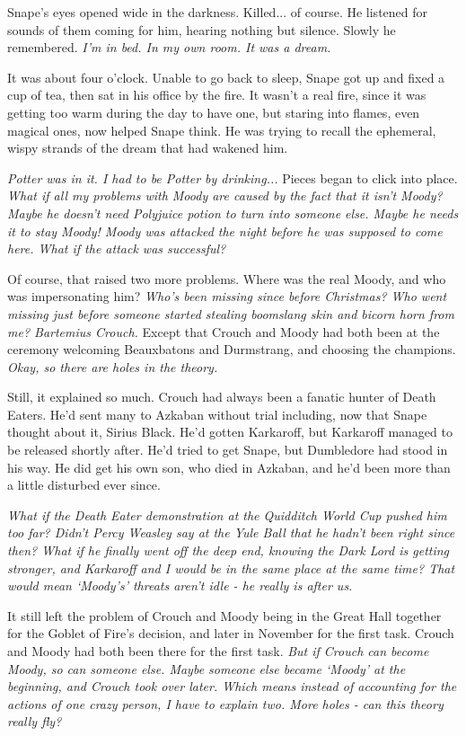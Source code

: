 \sbreak

Snape's eyes opened wide in the darkness. Killed... of course. He listened for sounds of them coming for him, hearing nothing but silence. Slowly he remembered. \emph{I'm in bed. In my own room. It was a dream.}

It was about four o'clock. Unable to go back to sleep, Snape got up and fixed a cup of tea, then sat in his office by the fire. It wasn't a real fire, since it was getting too warm during the day to have one, but staring into flames, even magical ones, now helped Snape think. He was trying to recall the ephemeral, wispy strands of the dream that had wakened him.

\emph{Potter was in it. I had to be Potter by drinking...} Pieces began to click into place. \emph{What if all my problems with Moody are caused by the fact that it isn't Moody? Maybe he doesn't need Polyjuice potion to turn into someone else. Maybe he needs it to stay Moody! Moody was attacked the night before he was supposed to come here. What if the attack was successful?}

Of course, that raised two more problems. Where was the real Moody, and who was impersonating him? \emph{Who's been missing since before Christmas? Who went missing just before someone started stealing boomslang skin and bicorn horn from me? Bartemius Crouch.} Except that Crouch and Moody had both been at the ceremony welcoming Beauxbatons and Durmstrang, and choosing the champions. \emph{Okay, so there are holes in the theory.}

Still, it explained so much. Crouch had always been a fanatic hunter of Death Eaters. He'd sent many to Azkaban without trial including, now that Snape thought about it, Sirius Black. He'd gotten Karkaroff, but Karkaroff managed to be released shortly after. He'd tried to get Snape, but Dumbledore had stood in his way. He did get his own son, who died in Azkaban, and he'd been more than a little disturbed ever since.

\emph{What if the Death Eater demonstration at the Quidditch World Cup pushed him too far? Didn't Percy Weasley say at the Yule Ball that he hadn't been right since then? What if he finally went off the deep end, knowing the Dark Lord is getting stronger, and Karkaroff and I would be in the same place at the same time? That would mean `Moody's' threats aren't idle - he really is after us.}

It still left the problem of Crouch and Moody being in the Great Hall together for the Goblet of Fire's decision, and later in November for the first task. Crouch and Moody had both been there for the first task. \emph{But if Crouch can become Moody, so can someone else. Maybe someone else became `Moody' at the beginning, and Crouch took over later. Which means instead of accounting for the actions of one crazy person, I have to explain two. More holes - can this theory really fly?}

